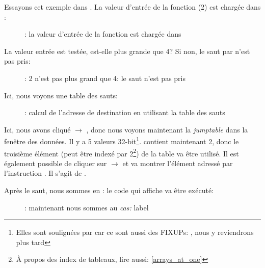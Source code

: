 ﻿\clearpage
\mysubparagraph{\olly}
\myindex{\olly}

Essayons cet exemple dans \olly.
La valeur d'entrée de la fonction (2) est chargée dans \EAX:

\begin{figure}[H]
\centering
{}
\caption{\olly: la valeur d'entrée de la fonction est chargée dans \EAX}
\label{fig:switch_lot_olly1}
\end{figure}

\clearpage
La valeur entrée est testée, est-elle plus grande que 4?
Si non, le saut par  n'est pas pris:
\begin{figure}[H]
\centering
{}
\caption{\olly: 2 n'est pas plus grand que 4: le saut n'est pas pris}
\label{fig:switch_lot_olly2}
\end{figure}

\clearpage
Ici, nous voyons une table des sauts:

\begin{figure}[H]
\centering
{}
\caption{\olly: calcul de l'adresse de destination en utilisant la table des sauts}
\label{fig:switch_lot_olly3}
\end{figure}

Ici, nous avons cliqué  $\rightarrow$ , donc
nous voyons maintenant la \emph{jumptable} dans la fenêtre des données.
Il y a 5 valeurs 32-bit\footnote{Elles sont soulignées par \olly car ce sont aussi
des FIXUPs: , nous y reviendrons plus tard}.
\ECX contient maintenant 2, donc le troisième élément (peut être indexé par 2\footnote{À
propos des index de tableaux, lire aussi: \ref{arrays_at_one}}) de la table va être
utilisé.
Il est également possible de cliquer sur  $\rightarrow$  et \olly va montrer l'élément adressé par l'instruction \JMP.
Il s'agit de .

\clearpage
Après le saut, nous sommes en : le code qui affiche  va être
exécuté:

\begin{figure}[H]
\centering
{}
\caption{\olly: maintenant nous sommes au \emph{cas:} label}
\label{fig:switch_lot_olly4}
\end{figure}
